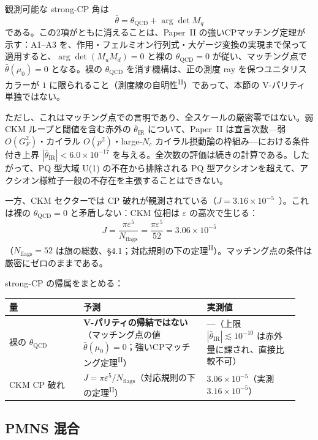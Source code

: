 \documentclass[fontsize=11pt,paper=a4,lualatex]{jlreq}
\newcommand{\PII}{\textsuperscript{\textup{II}}}
\begin{document}
観測可能な strong-CP 角は
\[\bar\theta = \theta_\mathrm{QCD} + \arg\det M_q\]
である。この2項がともに消えることは、Paper~II の強いCPマッチング定理が示す：A1--A3 を、作用・フェルミオン行列式・大ゲージ変換の実現まで保って適用すると、$\arg\det(M_uM_d) = 0$ と裸の $\theta_\mathrm{QCD} = 0$ が従い、マッチング点で $\bar\theta(\mu_0) = 0$ となる。裸の $\theta_\mathrm{QCD}$ を消す機構は、正の測度 ray を保つユニタリスカラーが $1$ に限られること（測度線の自明性\PII{}）であって、本節の V-パリティ単独ではない。

ただし、これはマッチング点での言明であり、全スケールの厳密零ではない。弱 CKM ループと閾値を含む赤外の $\bar\theta_\mathrm{IR}$ について、Paper~II は宣言次数---弱 $O(G_F^2)$・カイラル $O(p^2)$・large-$N_c$ カイラル摂動論の枠組み---における条件付き上界 $|\bar\theta_\mathrm{IR}| < 6.0\times10^{-17}$ を与える。全次数の評価は続きの計算である。したがって、PQ 型大域 U(1) の不在から排除される PQ 型アクシオンを超えて、アクシオン様粒子一般の不存在を主張することはできない。

一方、CKM セクターでは CP 破れが観測されている（$J = 3.16 \times 10^{-5}$~\cite{pdg}）。これは裸の $\theta_\mathrm{QCD} = 0$ と矛盾しない：CKM 位相は $\varepsilon$ の高次で生じる：
\[J = \frac{\pi\varepsilon^5}{N_\mathrm{flags}} = \frac{\pi\varepsilon^5}{52} = 3.06\times10^{-5}\]
（$N_\mathrm{flags} = 52$ は旗の総数、§4.1；対応規則の下の定理\PII{}）。マッチング点の条件は厳密にゼロのままである。

strong-CP の帰属をまとめる：

\medskip
\begin{center}
\small
\begin{tabular}{@{}p{0.24\linewidth}p{0.40\linewidth}p{0.30\linewidth}@{}}
\toprule
量 & 予測 & 実測値 \\
\midrule
裸の $\theta_\mathrm{QCD}$ & \textbf{V-パリティの帰結ではない}（マッチング点の値 $\bar\theta(\mu_0)=0$；強いCPマッチング定理\PII{}） & ---（上限 $|\bar\theta_\mathrm{IR}| \lesssim 10^{-10}$ は赤外量に課され、直接比較不可） \\
CKM CP 破れ & $J = \pi\varepsilon^5/N_\mathrm{flags}$（対応規則の下の定理\PII{}） & $3.06 \times 10^{-5}$（実測 $3.16 \times 10^{-5}$） \\
\bottomrule
\end{tabular}
\end{center}
\bigskip

\subsection{PMNS 混合}
\end{document}
